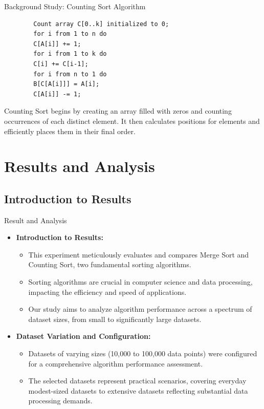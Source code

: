 \documentclass{beamer}
\begin{document}
\begin{frame}[fragile]{Background Study: Counting Sort Algorithm}
	\begin{verbatim}
		Count array C[0..k] initialized to 0;
		for i from 1 to n do
		C[A[i]] += 1;
		for i from 1 to k do
		C[i] += C[i-1];
		for i from n to 1 do
		B[C[A[i]]] = A[i];
		C[A[i]] -= 1;
	\end{verbatim}
	Counting Sort begins by creating an array filled with zeros and counting occurrences of each distinct element. It then calculates positions for elements and efficiently places them in their final order.\cite{geeksforgeeks-counting-sort}
\end{frame}

	
\section{Results and Analysis}
\subsection{Introduction to Results}
\begin{frame}{Result and Analysis}
	\begin{itemize}
		
		\item \textbf{Introduction to Results:}
		\begin{itemize}
			\item This experiment meticulously evaluates and compares Merge Sort and Counting Sort, two fundamental sorting algorithms.
			\item Sorting algorithms are crucial in computer science and data processing, impacting the efficiency and speed of applications.
			\item Our study aims to analyze algorithm performance across a spectrum of dataset sizes, from small to significantly large datasets.
		\end{itemize}
		
		\item \textbf{Dataset Variation and Configuration:}
		\begin{itemize}
			\item Datasets of varying sizes (10,000 to 100,000 data points) were configured for a comprehensive algorithm performance assessment.
			\item The selected datasets represent practical scenarios, covering everyday modest-sized datasets to extensive datasets reflecting substantial data processing demands.
		\end{itemize}
	\end{itemize}
	
\end{frame}
\end{document}
